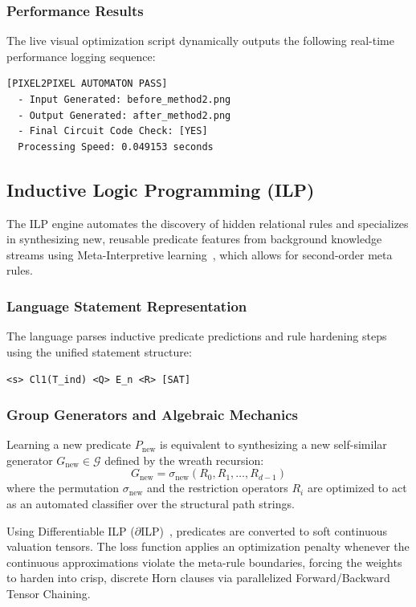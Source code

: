 \documentclass[twocolumn]{article}
\begin{document}
\subsubsection{Performance Results}
The live visual optimization script dynamically outputs the following real-time performance logging sequence:
\begin{verbatim}
[PIXEL2PIXEL AUTOMATON PASS]
  - Input Generated: before_method2.png
  - Output Generated: after_method2.png
  - Final Circuit Code Check: [YES]
  Processing Speed: 0.049153 seconds
\end{verbatim}


\subsection{Inductive Logic Programming (ILP)}
The ILP engine automates the discovery of hidden relational rules and specializes in synthesizing new, reusable predicate features from background knowledge streams using Meta-Interpretive learning~\cite{patsantzis2021top}, which allows for second-order meta rules.

\subsubsection{Language Statement Representation}
The language parses inductive predicate predictions and rule hardening steps using the unified statement structure:
\begin{center}
    \texttt{<s> Cl1(T\_ind) <Q> E\_n <R> [SAT]}
\end{center}

\subsubsection{Group Generators and Algebraic Mechanics}
Learning a new predicate $P_{\text{new}}$ is equivalent to synthesizing a new self-similar generator $G_{\text{new}} \in \mathcal{G}$ defined by the wreath recursion:
\begin{equation}
    G_{\text{new}} = \sigma_{\text{new}} (R_0, R_1, \dots, R_{d-1})
\end{equation}
where the permutation $\sigma_{\text{new}}$ and the restriction operators $R_i$ are optimized to act as an automated classifier over the structural path strings.

Using Differentiable ILP ($\partial$ILP)~\cite{upreti2025}, predicates are converted to soft continuous valuation tensors. The loss function applies an optimization penalty whenever the continuous approximations violate the meta-rule boundaries, forcing the weights to harden into crisp, discrete Horn clauses via parallelized Forward/Backward Tensor Chaining.
\end{document}
